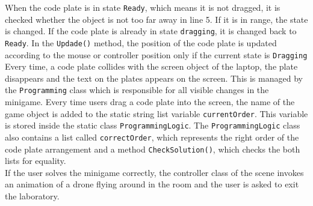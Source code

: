 When the code plate is in state \texttt{Ready}, which means it is not dragged, it is checked whether the object is not too far away in line 5. If it is in range, the state is changed. If the code plate is already in state \texttt{dragging}, it is changed back to \texttt{Ready}. In the \texttt{Updade()} method, the position of the code plate is updated according to the mouse or controller position only if the current state is \texttt{Dragging}\\
Every time, a code plate collides with the screen object of the laptop, the plate disappears and the text on the plates appears on the screen. This is managed by the \texttt{Programming} class which is responsible for all visible changes in the minigame. Every time users drag a code plate into the screen, the name of the game object is added to the static string list variable \texttt{currentOrder}. This variable is stored inside the static class \texttt{ProgrammingLogic}. The \texttt{ProgrammingLogic} class also contains a list called \texttt{correctOrder}, which represents the right order of the code plate arrangement and a method \texttt{CheckSolution()}, which checks the both lists for equality.\\
If the user solves the minigame correctly, the controller class of the scene invokes an animation of a drone flying around in the room and the user is asked to exit the laboratory.

\newpage
